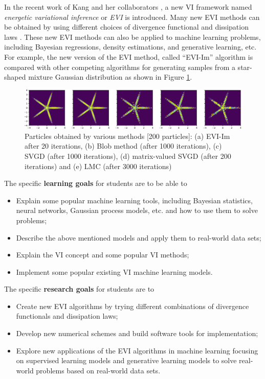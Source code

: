 In the recent work of Kang and her collaborators \cite{wang2021particle}, a new VI framework named \emph{energetic variational inference} or \emph{EVI} is introduced. 
Many new EVI methods can be obtained by using different choices of divergence functional \cite{amari2012differential} and dissipation laws \cite{liu2020variational}.
These new EVI methods can also be applied to machine learning problems, including Bayesian regressions, density estimations, and generative learning, etc. 
For example, the new version of the EVI method, called ``EVI-Im'' algorithm is compared with other competing algorithms for generating samples from a star-shaped mixture Gaussian distribution as shown in Figure \ref{fig:star}. 
\begin{figure}[thbp]
\centering
\includegraphics[width=\linewidth]{Star_compare}
\caption{ Particles obtained by various methods [200 particles]: (a) EVI-Im after 20 iterations, (b) Blob method (after 1000 iterations), (c) SVGD (after 1000 iterations), (d) matrix-valued SVGD (after 200 iterations) and (e) LMC (after 3000 iterations)}\label{fig:star}
\end{figure}

The specific {\bf learning goals} for students are  to be able to
\begin{itemize}
    \item Explain some popular machine learning tools, including Bayesian statistics, neural networks, Gaussian process models, etc. and how to use them to solve problems;
    \item Describe the above mentioned models and apply them to real-world data sets;
    \item Explain the VI concept and some popular VI methods;
    \item Implement some popular existing VI machine learning models.
\end{itemize}
The specific {\bf research goals} for students are to
\begin{itemize}
    \item Create new EVI algorithms by trying different combinations of divergence functionals and dissipation laws;
    \item Develop new numerical schemes and build software tools for implementation;
    \item Explore new applications of the EVI algorithms in machine learning focusing on supervised learning models and generative learning models to solve real-world problems based on real-world data sets. 
\end{itemize}